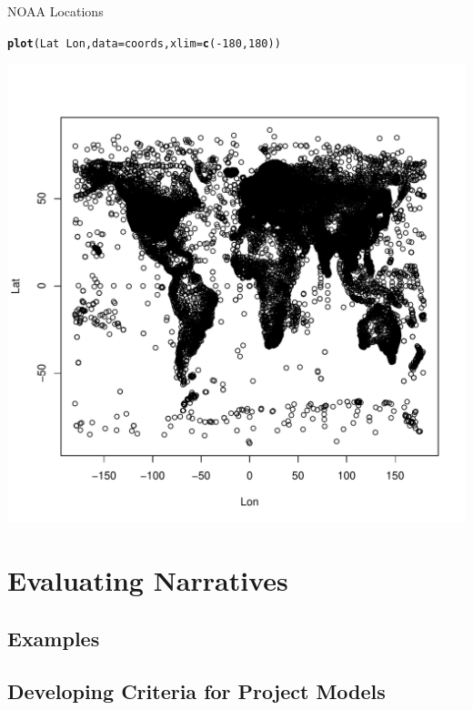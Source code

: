 \documentclass{article}\usepackage[]{graphicx}\usepackage[]{color}
\makeatletter
\def\maxwidth{ %
  \ifdim\Gin@nat@width>\linewidth
    \linewidth
  \else
    \Gin@nat@width
  \fi
}
\newcommand{\hlnum}[1]{\textcolor[rgb]{0.686,0.059,0.569}{#1}}%
\newcommand{\hlopt}[1]{\textcolor[rgb]{0,0,0}{#1}}%
\newcommand{\hlstd}[1]{\textcolor[rgb]{0.345,0.345,0.345}{#1}}%
\newcommand{\hlkwc}[1]{\textcolor[rgb]{0.333,0.667,0.333}{#1}}%
\newcommand{\hlkwd}[1]{\textcolor[rgb]{0.737,0.353,0.396}{\textbf{#1}}}%
\newenvironment{kframe}{%
 \def\at@end@of@kframe{}%
 \ifinner\ifhmode%
  \def\at@end@of@kframe{\end{minipage}}%
  \begin{minipage}{\columnwidth}%
 \fi\fi%
 \def\FrameCommand##1{\hskip\@totalleftmargin \hskip-\fboxsep
 \colorbox{shadecolor}{##1}\hskip-\fboxsep
     \hskip-\linewidth \hskip-\@totalleftmargin \hskip\columnwidth}%
 \MakeFramed {\advance\hsize-\width
   \@totalleftmargin\z@ \linewidth\hsize
   \@setminipage}}%
 {\par\unskip\endMakeFramed%
 \at@end@of@kframe}
\newenvironment{knitrout}{}{} %
\makeatother
\begin{document}
NOAA Locations
\begin{knitrout}
\color{fgcolor}\begin{kframe}
\begin{alltt}
\hlkwd{plot}\hlstd{(Lat} \hlopt{~} \hlstd{Lon,} \hlkwc{data}\hlstd{=coords,} \hlkwc{xlim}\hlstd{=}\hlkwd{c}\hlstd{(}\hlopt{-}\hlnum{180}\hlstd{,} \hlnum{180}\hlstd{) )}
\end{alltt}
\end{kframe}
\includegraphics[width=\maxwidth]{figure/NOAApoints-1} 

\end{knitrout}


\section{Evaluating Narratives}

\subsection{Examples}


\subsection{Developing Criteria for Project Models}

\subsection{}

\subsection{}
\end{document}
